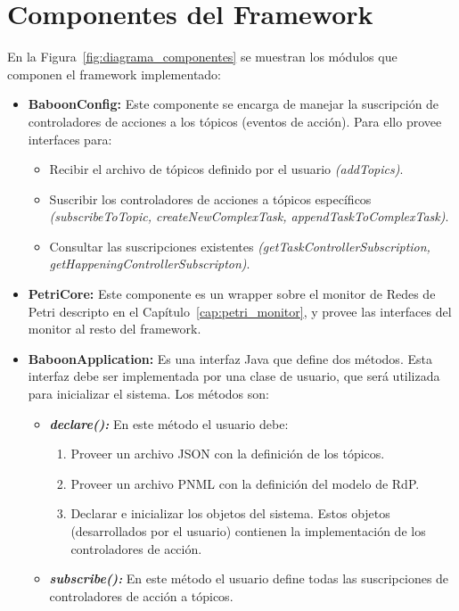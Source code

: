 \section{Componentes del Framework}
\label{sec:componentes_baboon}
En la Figura~\ref{fig:diagrama_componentes} se muestran los
módulos que componen el framework implementado:
\begin{itemize}
  \item \textbf{BaboonConfig: } Este componente se encarga de manejar la
  suscripción de controladores de acciones a los tópicos (eventos de acción).
  Para ello provee interfaces para:
	  \begin{itemize}
	    \item Recibir el archivo de tópicos definido por el usuario
	    \emph{(addTopics)}.
	    \item Suscribir los controladores de acciones a tópicos específicos
	    \emph{(subscribeToTopic, createNewComplexTask, appendTaskToComplexTask)}.
	    \item Consultar las suscripciones existentes
	    \emph{(getTaskControllerSubscription,
	    getHappeningControllerSubscripton)}.
	  \end{itemize}
	  
  \item \textbf{PetriCore: } Este componente es un wrapper sobre el monitor de
  Redes de Petri descripto en el
  Capítulo~\ref{cap:petri_monitor}, y provee las interfaces del
  monitor al resto del framework.
  
  \item \textbf{BaboonApplication: } Es una interfaz Java que define dos
  métodos. Esta interfaz debe ser implementada por una clase de usuario, que
  será utilizada para inicializar el sistema. Los métodos son:
      \begin{itemize}
        \item \textbf{\emph{declare(): }} En este método el usuario debe:
        	\begin{enumerate}
        	  \item Proveer un archivo JSON con la definición de los tópicos.
        	  \item Proveer un archivo PNML con la definición del modelo de RdP.
        	  \item Declarar e inicializar los objetos del sistema. Estos objetos
        	  (desarrollados por el usuario) contienen la implementación
        	  de los controladores de acción.
        	\end{enumerate}
        \item \textbf{\emph{subscribe(): }} En este método el usuario define todas
        las suscripciones de controladores de acción a tópicos.
       \end{itemize}
   

\end{itemize}
